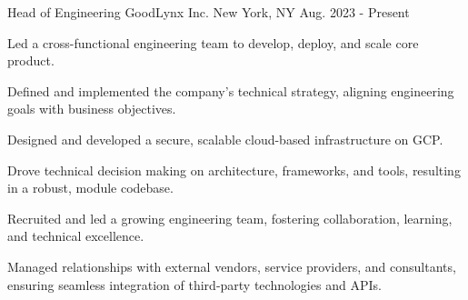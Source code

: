 


\begin{cventries}


\cventry
{Head of Engineering} %
{GoodLynx Inc.} %
{New York, NY} %
{Aug. 2023 - Present} %
{ %
\begin{cvitems}
\item {Led a cross-functional engineering team to develop, deploy, and scale core product.}
\item {Defined and implemented the company's technical strategy, aligning engineering goals with business objectives.}
\item {Designed and developed a secure, scalable cloud-based infrastructure on GCP.}
\item {Drove technical decision making on architecture, frameworks, and tools, resulting in a robust, module codebase.}
\item {Recruited and led a growing engineering team, fostering collaboration, learning, and technical excellence.}
\item {Managed relationships with external vendors, service providers, and consultants, ensuring seamless integration of third-party technologies and APIs.}
\end{cvitems}
\bigskip
}



\end{cventries}
